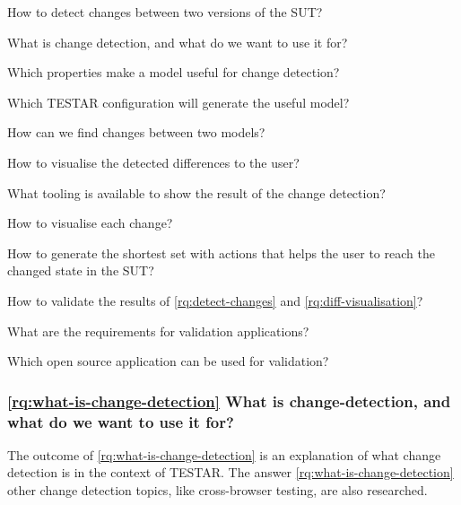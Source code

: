 \begin{questions}
    \item How to detect changes between two versions of the SUT? \label{rq:detect-changes}
    \begin{questions}
        \item What is change detection, and what do we want to use it for? \label{rq:what-is-change-detection}
        \item Which properties make a model useful for change detection? \label{rq:useful-detection}
        \item Which TESTAR configuration will generate the useful model? \label{rq:TESTAR-configug}
        \item How can we find changes between two models? \label{rq:finding-changes}
    \end{questions}

    \item How to visualise the detected differences to the user? \label{rq:diff-visualisation}
    \begin{questions}
        \item What tooling is available to show the result of the change detection? \label{rq:tooling}
        \item How to visualise each change? \label{rq:type-visualisation}
        \item How to generate the shortest set with actions that helps the user to reach the changed state in the SUT? \label{rq:shortest-set}    
    \end{questions}
    
    \item How to validate the results of \ref{rq:detect-changes} and \ref{rq:diff-visualisation}? \label{rq:validation}
    \begin{questions}
        \item What are the requirements for validation applications? \label{rq:req-apps}
        \item Which open source application can be used for validation? \label{rq:validation-apps}
        \item 
    \end{questions}
\end{questions}

\subsubsection{\ref{rq:what-is-change-detection} What is change-detection, and what do we want to use it for?}
The outcome of \ref{rq:what-is-change-detection} is an explanation of what change detection is in the context of TESTAR. The answer \ref{rq:what-is-change-detection} other change detection topics, like cross-browser testing, are also researched. 

